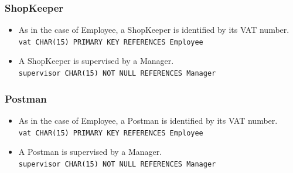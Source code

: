 \documentclass{report}[a4paper]
\theoremstyle{remark}
\begin{document}
\subsubsection{ShopKeeper}
\begin{itemize}
    \item As in the case of Employee, a ShopKeeper is identified by its VAT number.             \\ \texttt{vat CHAR(15) PRIMARY KEY REFERENCES Employee}
    \item A ShopKeeper is supervised by a Manager.                                              \\ \texttt{supervisor CHAR(15) NOT NULL REFERENCES Manager}
\end{itemize}
\subsubsection{Postman}
\begin{itemize}
    \item As in the case of Employee, a Postman is identified by its VAT number.                \\ \texttt{vat CHAR(15) PRIMARY KEY REFERENCES Employee}
    \item A Postman is supervised by a Manager.                                                 \\ \texttt{supervisor CHAR(15) NOT NULL REFERENCES Manager}
\end{itemize}
\end{document}
